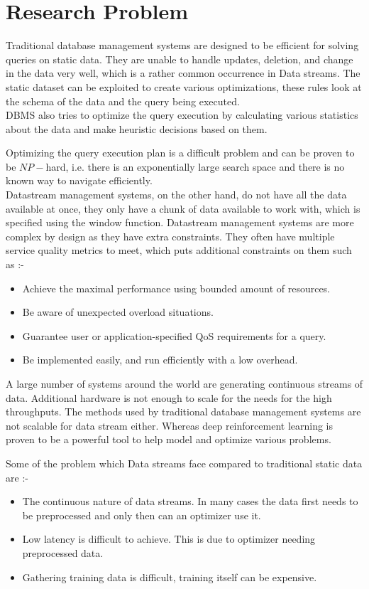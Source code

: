 \section{Research Problem}
\label{sec:Problem at hand}
Traditional database management systems are designed to be efficient for solving queries on static data. They are unable to handle updates, deletion, and change in the data very well, which is a rather common occurrence in Data streams. The static dataset can be exploited to create various optimizations, these rules look at the schema of the data and the query being executed.\\
DBMS also tries to optimize the query execution by calculating various statistics about the data and make heuristic decisions based on them.    
\par Optimizing the query execution plan is a difficult problem and can be proven to be $NP-$hard, i.e. there is an exponentially large search space and there is no known way to navigate efficiently.\\
Datastream management systems, on the other hand, do not have all the data available at once, they only have a chunk of data available to work with, which is specified using the window function. Datastream management systems are more complex by design as they have extra constraints. They often have multiple service quality metrics to meet, which puts additional constraints on them such as \cite{stream_optimization} :-
\begin{itemize}
    \item Achieve the maximal performance using bounded amount of resources.
    \item Be aware of unexpected overload situations.
    \item Guarantee user or application-specified QoS requirements for a query.
    \item Be implemented easily, and run efficiently with a low overhead.
\end{itemize}
\par A large number of systems around the world are generating continuous streams of data. Additional hardware is not enough to scale for the needs for the high throughputs. The methods used by traditional database management systems are not scalable for data stream either. Whereas deep reinforcement learning is proven to be a powerful tool to help model and optimize various problems.
\par Some of the problem which Data streams face compared to traditional static data are \cite{stream_optimization}:-
\begin{itemize}
    \item The continuous nature of data streams. In many cases the data first needs to be preprocessed and only then can an optimizer use it.
    \item Low latency is difficult to achieve. This is due to optimizer needing preprocessed data.
    \item Gathering training data is difficult, training itself can be expensive.
\end{itemize}

